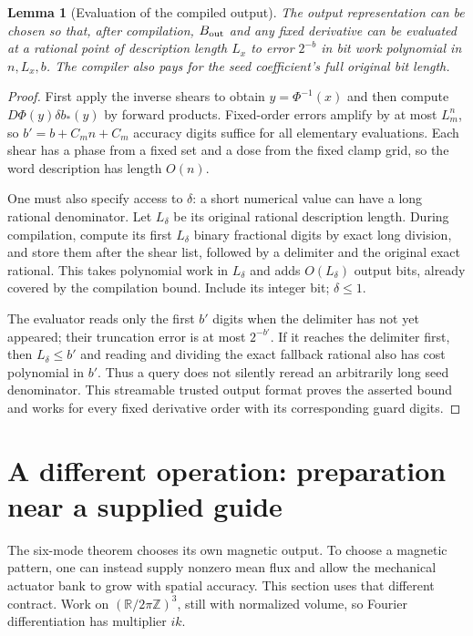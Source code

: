 \documentclass[11pt,a4paper]{amsart}
\newtheorem{lemma}[theorem]{Lemma}
\theoremstyle{definition}
\theoremstyle{remark}
\numberwithin{equation}{section}
\newcommand{\R}{\mathbb R}
\newcommand{\Z}{\mathbb Z}
\begin{document}
\begin{lemma}[Evaluation of the compiled output]\label{lem:compiledquery}
The output representation can be chosen so that, after compilation, $B_{\rm out}$ and any fixed derivative can be evaluated at a rational point of description length $L_x$ to error $2^{-b}$ in bit work polynomial in $n,L_x,b$. The compiler also pays for the seed coefficient's full original bit length.
\end{lemma}

\begin{proof}
First apply the inverse shears to obtain $y=\Phi^{-1}(x)$ and then compute $D\Phi(y)\delta b_*(y)$ by forward products. Fixed-order errors amplify by at most $L_m^n$, so $b'=b+C_mn+C_m$ accuracy digits suffice for all elementary evaluations. Each shear has a phase from a fixed set and a dose from the fixed clamp grid, so the word description has length $O(n)$.

One must also specify access to $\delta$: a short numerical value can have a long rational denominator. Let $L_\delta$ be its original rational description length. During compilation, compute its first $L_\delta$ binary fractional digits by exact long division, and store them after the shear list, followed by a delimiter and the original exact rational. This takes polynomial work in $L_\delta$ and adds $O(L_\delta)$ output bits, already covered by the compilation bound. Include its integer bit; $\delta\le1$.

The evaluator reads only the first $b'$ digits when the delimiter has not yet appeared; their truncation error is at most $2^{-b'}$. If it reaches the delimiter first, then $L_\delta\le b'$ and reading and dividing the exact fallback rational also has cost polynomial in $b'$. Thus a query does not silently reread an arbitrarily long seed denominator. This streamable trusted output format proves the asserted bound and works for every fixed derivative order with its corresponding guard digits.
\end{proof}



\section{A different operation: preparation near a supplied guide}\label{sec:guide}

The six-mode theorem chooses its own magnetic output. To choose a magnetic pattern, one can instead supply nonzero mean flux and allow the mechanical actuator bank to grow with spatial accuracy. This section uses that different contract. Work on $(\R/2\pi\Z)^3$, still with normalized volume, so Fourier differentiation has multiplier $ik$.
\end{document}
